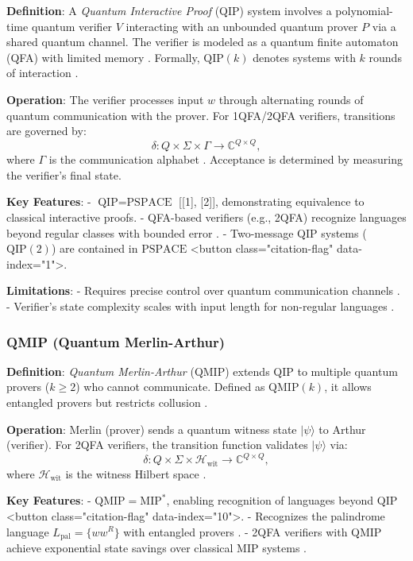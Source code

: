 \textbf{Definition}: A \textit{Quantum Interactive Proof} (QIP) system involves a polynomial-time quantum verifier \( V \) interacting with an unbounded quantum prover \( P \) via a shared quantum channel. The verifier is modeled as a quantum finite automaton (QFA) with limited memory \cite{zheng2015power}. Formally, \( \text{QIP}(k) \) denotes systems with \( k \) rounds of interaction \cite{nishimura2009application}.

\textbf{Operation}: The verifier processes input \( w \) through alternating rounds of quantum communication with the prover. For 1QFA/2QFA verifiers, transitions are governed by:
\[
\delta: Q \times \Sigma \times \Gamma \to \mathbb{C}^{Q \times Q},
\]
where \( \Gamma \) is the communication alphabet \cite{zheng2015power}. Acceptance is determined by measuring the verifier's final state.

\textbf{Key Features}:
- \( \text{QIP} = \text{PSPACE} \) [[1], [2]], demonstrating equivalence to classical interactive proofs.
- QFA-based verifiers (e.g., 2QFA) recognize languages beyond regular classes with bounded error \cite{nishimura2009application}.
- Two-message QIP systems (\( \text{QIP}(2) \)) are contained in \( \text{PSPACE} \) <button class="citation-flag" data-index="1">.

\textbf{Limitations}: 
- Requires precise control over quantum communication channels \cite{zheng2015power}.
- Verifier's state complexity scales with input length for non-regular languages \cite{nishimura2009application}.

\subsubsection{QMIP (Quantum Merlin-Arthur)}
\label{sssec:qmip}

\textbf{Definition}: \textit{Quantum Merlin-Arthur} (QMIP) extends QIP to multiple quantum provers (\( k \geq 2 \)) who cannot communicate. Defined as \( \text{QMIP}(k) \), it allows entangled provers but restricts collusion \cite{scegulnaja2010postselection}.

\textbf{Operation}: Merlin (prover) sends a quantum witness state \( |\psi\rangle \) to Arthur (verifier). For 2QFA verifiers, the transition function validates \( |\psi\rangle \) via:
\[
\delta: Q \times \Sigma \times \mathcal{H}_\text{wit} \to \mathbb{C}^{Q \times Q},
\]
where \( \mathcal{H}_\text{wit} \) is the witness Hilbert space \cite{yamakami2014constant}.

\textbf{Key Features}:
- \( \text{QMIP} = \text{MIP}^* \), enabling recognition of languages beyond \( \text{QIP} \) <button class="citation-flag" data-index="10">.
- Recognizes the palindrome language \( L_{\text{pal}} = \{ww^R\} \) with entangled provers \cite{scegulnaja2010postselection}.
- 2QFA verifiers with QMIP achieve exponential state savings over classical MIP systems \cite{zheng2015power}.

